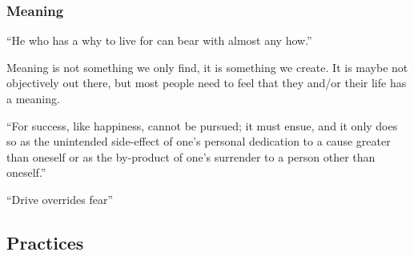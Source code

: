 \documentclass{article}
\begin{document}
\subsubsection{Meaning}

\vspace{1cm}
{``He who has a why to live for can bear with almost any how.''
\\[5pt]
}

Meaning is not something we only find, it is something we create. It is maybe not objectively out there, but most people need to feel that they and/or their life has a meaning.

\vspace{1cm}
{``For success, like happiness, cannot be pursued; it must ensue, and it only does so as the unintended side-effect of one’s personal dedication to a cause greater than oneself or as the by-product of one’s surrender to a person other than oneself.''
\\[5pt]
}


\vspace{1cm}
{``Drive overrides fear''
\\[5pt]
}


\subsection{Practices}
\end{document}
